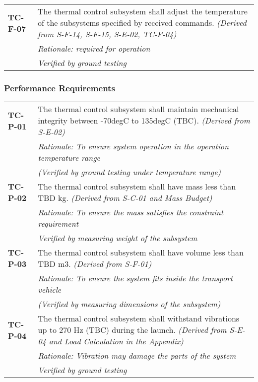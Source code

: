 \begin{longtable}{P{2cm}P{13.25cm}}
\textbf{TC-F-07}	& The thermal control subsystem shall adjust the temperature of the subsystems specified by received commands. \textit{(Derived from S-F-14, S-F-15, S-E-02, TC-F-04)} \\
 & \textit{Rationale: required for operation} \\
 & \textit{Verified by ground testing}
\end{longtable}
\vspace{-15pt}
\subsubsection*{Performance Requirements}
\vspace{-15pt}

\begin{longtable}{P{2cm}P{13.25cm}}

\textbf{TC-P-01}	&
The thermal control subsystem shall maintain mechanical integrity between -70\gls{degC} to 135\gls{degC} (\gls{TBC}).
\textit{(Derived from S-E-02)}	\\
& \textit{Rationale: To ensure system operation in the operation temperature range} \\
& \textit{(Verified by ground testing under temperature range)}	\\

\textbf{TC-P-02}	&
The thermal control subsystem shall have mass less than \gls{TBD} \gls{kg}.
\textit{(Derived from S-C-01 and Mass Budget)}	\\
& \textit{Rationale: To ensure the mass satisfies the constraint requirement} \\
& \textit{Verified by measuring weight of the subsystem}	\\

\textbf{TC-P-03}	&
The thermal control subsystem shall have volume less than \gls{TBD} \gls{m3}.
\textit{(Derived from S-F-01)}	\\
& \textit{Rationale: To ensure the system fits inside the transport vehicle} \\
& \textit{(Verified by measuring dimensions of the subsystem)}	\\

\textbf{TC-P-04}	&
The thermal control subsystem shall withstand vibrations up to 270 \gls{Hz} (\gls{TBC}) during the launch.
\textit{(Derived from S-E-04 and Load Calculation in the Appendix)}	\\
& \textit{Rationale: Vibration may damage the parts of the system} \\
& \textit{Verified by ground testing}	\\


\end{longtable}
